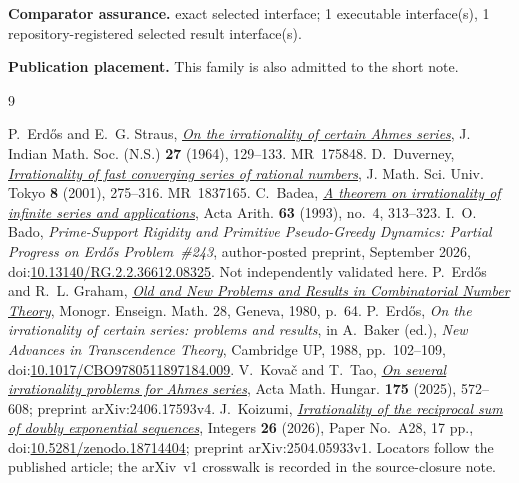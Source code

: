 \documentclass[11pt]{article}
\begin{document}
\textbf{Comparator assurance.} exact selected interface; 1 executable interface(s), 1 repository-registered selected result interface(s).

\textbf{Publication placement.} This family is also admitted to the short note.
\begin{thebibliography}{9}
\small
\raggedright
\setlength{\itemsep}{0pt}
 P.~Erd\H{o}s and E.~G. Straus,
  \href{https://users.renyi.hu/~p_erdos/1964-19.pdf}{\emph{On the irrationality
  of certain Ahmes series}},
  J. Indian Math. Soc. (N.S.) \textbf{27} (1964), 129--133. MR~175848.
 D.~Duverney,
  \href{https://www.ms.u-tokyo.ac.jp/journal/pdf/jms080206.pdf}
  {\emph{Irrationality of fast converging series of rational numbers}},
  J. Math. Sci. Univ. Tokyo \textbf{8} (2001), 275--316. MR~1837165.
 C.~Badea,
  \href{https://matwbn.icm.edu.pl/ksiazki/aa/aa63/aa6342.pdf}{\emph{A theorem
  on irrationality of infinite series and applications}}, Acta Arith.
  \textbf{63} (1993), no.~4, 313--323.
 I.~O. Bado,
  \emph{Prime-Support Rigidity and Primitive Pseudo-Greedy Dynamics:
  Partial Progress on Erd\H{o}s Problem~\#243}, author-posted preprint,
  September 2026, doi:\href{https://doi.org/10.13140/RG.2.2.36612.08325}
  {10.13140/RG.2.2.36612.08325}.  Not independently validated here.
 P.~Erd\H{o}s and R.~L. Graham,
  \href{https://mathweb.ucsd.edu/~ronspubs/80_11_number_theory.pdf}{\emph{Old
  and New Problems and Results in Combinatorial Number Theory}},
  Monogr. Enseign. Math. 28, Geneva, 1980, p.~64.
 P.~Erd\H{o}s, \emph{On the irrationality of certain series:
  problems and results}, in A.~Baker (ed.), \emph{New Advances in Transcendence
  Theory}, Cambridge UP, 1988, pp.~102--109,
  doi:\href{https://doi.org/10.1017/CBO9780511897184.009}{10.1017/CBO9780511897184.009}.
 V.~Kova\v{c} and T.~Tao,
  \href{https://arxiv.org/abs/2406.17593}{\emph{On several irrationality
  problems for Ahmes series}}, Acta Math. Hungar. \textbf{175} (2025),
  572--608; preprint arXiv:2406.17593v4.
 J.~Koizumi,
  \href{https://math.colgate.edu/~integers/aa28/aa28.pdf}
  {\emph{Irrationality of the reciprocal sum of doubly exponential sequences}},
  Integers \textbf{26} (2026), Paper No.~A28, 17 pp.,
  doi:\href{https://doi.org/10.5281/zenodo.18714404}{10.5281/zenodo.18714404};
  preprint arXiv:2504.05933v1.  Locators follow the published article;
  the arXiv~v1 crosswalk is recorded in the source-closure note.

\end{thebibliography}
\end{document}
